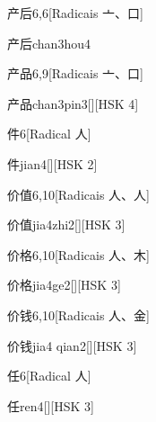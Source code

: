 \begin{entry}{产后}{6,6}[Radicais ⼇、⼝]
  \begin{phonetics}{产后}{chan3hou4}
  \end{phonetics}
\end{entry}

\begin{entry}{产品}{6,9}[Radicais ⼇、⼝]
  \begin{phonetics}{产品}{chan3pin3}[][HSK 4]
  \end{phonetics}
\end{entry}

\begin{entry}{件}{6}[Radical ⼈]
  \begin{phonetics}{件}{jian4}[][HSK 2]
  \end{phonetics}
\end{entry}

\begin{entry}{价值}{6,10}[Radicais ⼈、⼈]
  \begin{phonetics}{价值}{jia4zhi2}[][HSK 3]
  \end{phonetics}
\end{entry}

\begin{entry}{价格}{6,10}[Radicais ⼈、⽊]
  \begin{phonetics}{价格}{jia4ge2}[][HSK 3]
  \end{phonetics}
\end{entry}

\begin{entry}{价钱}{6,10}[Radicais ⼈、⾦]
  \begin{phonetics}{价钱}{jia4 qian2}[][HSK 3]
  \end{phonetics}
\end{entry}

\begin{entry}{任}{6}[Radical ⼈]
  \begin{phonetics}{任}{ren4}[][HSK 3]
  \end{phonetics}
\end{entry}

